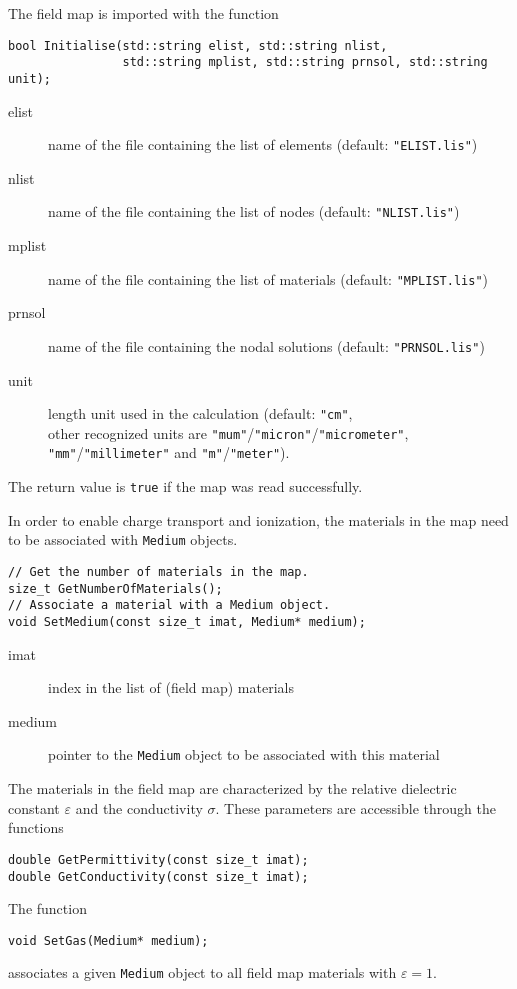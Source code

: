 The field map is imported with the function
\begin{lstlisting}
bool Initialise(std::string elist, std::string nlist,
                std::string mplist, std::string prnsol, std::string unit);
\end{lstlisting}
\begin{description}
  \item[elist]
  name of the file containing the list of elements 
  (default: \texttt{"ELIST.lis"})
  \item[nlist]
  name of the file containing the list of nodes
  (default: \texttt{"NLIST.lis"})
  \item[mplist]
  name of the file containing the list of materials
  (default: \texttt{"MPLIST.lis"})
  \item[prnsol]
  name of the file containing the nodal solutions
  (default: \texttt{"PRNSOL.lis"})
  \item[unit]
  length unit used in the calculation (default: \texttt{"cm"}, \\ 
  other recognized units are 
  \texttt{"mum"}/\texttt{"micron"}/\texttt{"micrometer"},
  \texttt{"mm"}/\texttt{"millimeter"} and 
  \texttt{"m"}/\texttt{"meter"}).
\end{description}
The return value is \texttt{true} if the map was read successfully.

In order to enable charge transport and ionization,
the materials in the map need to be associated with \texttt{Medium} objects.
\begin{lstlisting}
// Get the number of materials in the map.
size_t GetNumberOfMaterials();
// Associate a material with a Medium object.
void SetMedium(const size_t imat, Medium* medium);
\end{lstlisting}
\begin{description}
\item[imat]
index in the list of (field map) materials
\item[medium]
pointer to the \texttt{Medium} object to be associated with this material
\end{description}

The materials in the field map are characterized by the 
relative dielectric constant \(\varepsilon\) and the 
conductivity \(\sigma\). 
These parameters are accessible through the functions
\begin{lstlisting}
double GetPermittivity(const size_t imat);
double GetConductivity(const size_t imat);
\end{lstlisting}
The function
\begin{lstlisting}
void SetGas(Medium* medium);
\end{lstlisting}
associates a given \texttt{Medium} object to all field map materials 
with $\varepsilon = 1$.
 
